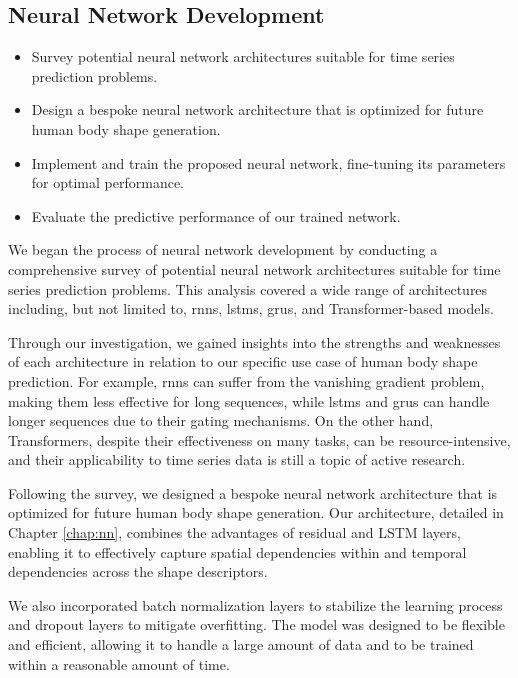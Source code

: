 \subsection{Neural Network Development}

\begin{itemize}
      \item Survey potential neural network architectures suitable for time series
            prediction problems.
      \item Design a bespoke neural network architecture that is optimized for future human
            body shape generation.
      \item Implement and train the proposed neural network, fine-tuning its parameters for
            optimal performance.
      \item Evaluate the predictive performance of our trained network.
\end{itemize}

We began the process of neural network development by conducting a
comprehensive survey of potential neural network architectures suitable for
time series prediction problems. This analysis covered a wide range of
architectures including, but not limited to, \glspl{rnn}, \glspl{lstm},
\glspl{gru}, and Transformer-based models.

Through our investigation, we gained insights into the strengths and weaknesses
of each architecture in relation to our specific use case of human body shape
prediction. For example, \glspl{rnn} can suffer from the vanishing gradient
problem, making them less effective for long sequences, while \glspl{lstm} and
\glspl{gru} can handle longer sequences due to their gating mechanisms. On the
other hand, Transformers, despite their effectiveness on many tasks, can be
resource-intensive, and their applicability to time series data is still a
topic of active research.

Following the survey, we designed a bespoke neural network architecture that is
optimized for future human body shape generation. Our architecture, detailed in
Chapter \ref{chap:nn}, combines the advantages of residual and LSTM layers,
enabling it to effectively capture spatial dependencies within and temporal
dependencies across the shape descriptors.

We also incorporated batch normalization layers to stabilize the learning
process and dropout layers to mitigate overfitting. The model was designed to
be flexible and efficient, allowing it to handle a large amount of data and to
be trained within a reasonable amount of time.

